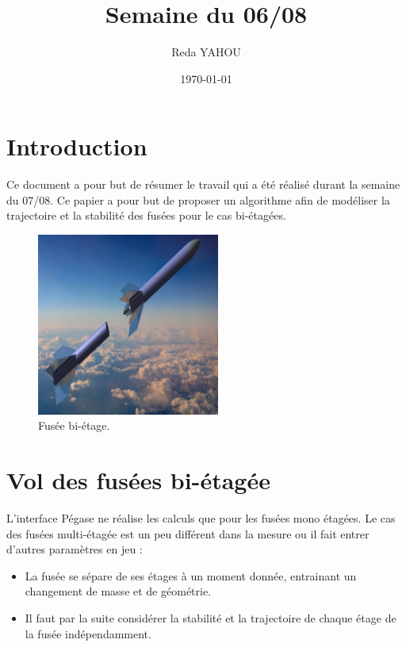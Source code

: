 \documentclass[a4paper]{article}
\title{Semaine du 06/08}
\author{Reda YAHOU}
\date{\today}
\begin{document}
\maketitle

\section*{Introduction}

Ce document a pour but de résumer le travail qui a été réalisé durant la semaine du 07/08. Ce papier a pour but de proposer un algorithme afin de modéliser la trajectoire et la stabilité des fusées pour le cas bi-étagées.\\




\begin{figure}[!htbp]
\begin{center}
\includegraphics[width=6cm]{complet-1024x494.jpg} 
\end{center}
\caption{Fusée bi-étage.}
\end{figure}





\section{Vol des fusées bi-étagée}

L'interface Pégase ne réalise les calculs que pour les fusées mono étagées. Le cas des fusées multi-étagée est un peu différent dans la mesure ou il fait entrer d'autres paramètres en jeu : \\

\begin{itemize}
\item La fusée se sépare de ses étages à un moment donnée, entrainant un changement de masse et de géométrie.
\item Il faut par la suite considérer la stabilité et la trajectoire de chaque étage de la fusée indépendamment.
\end{itemize}
\end{document}
